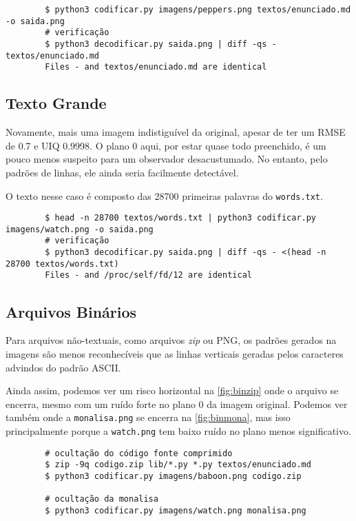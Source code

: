     \begin{verbatim}
        $ python3 codificar.py imagens/peppers.png textos/enunciado.md -o saida.png
        # verificação
        $ python3 decodificar.py saida.png | diff -qs - textos/enunciado.md
        Files - and textos/enunciado.md are identical
    \end{verbatim}

\subsection{Texto Grande}

    

    Novamente, mais uma imagem indistiguível da original, apesar de ter um RMSE de 0.7 e UIQ 0.9998. O plano 0 aqui, por estar quase todo preenchido, é um pouco menos suspeito para um observador desacustumado. No entanto, pelo padrões de linhas, ele ainda seria facilmente detectável.

    O texto nesse caso é composto das 28700 primeiras palavras do \texttt{words.txt}.

    \begin{verbatim}
        $ head -n 28700 textos/words.txt | python3 codificar.py imagens/watch.png -o saida.png
        # verificação
        $ python3 decodificar.py saida.png | diff -qs - <(head -n 28700 textos/words.txt)
        Files - and /proc/self/fd/12 are identical
    \end{verbatim}

\subsection{Arquivos Binários} \label{sec:binarios}

    
    

    Para arquivos não-textuais, como arquivos \textit{zip} ou PNG, os padrões gerados na imagens são menos reconhecíveis que as linhas verticais geradas pelos caracteres advindos do padrão ASCII.

    Ainda assim, podemos ver um risco horizontal na \cref{fig:binzip} onde o arquivo se encerra, mesmo com um ruído forte no plano 0 da imagem original. Podemos ver também onde a \texttt{monalisa.png} se encerra na \cref{fig:binmona}, mas isso principalmente porque a \texttt{watch.png} tem baixo ruído no plano menos significativo.

    \begin{verbatim}
        # ocultação do código fonte comprimido
        $ zip -9q codigo.zip lib/*.py *.py textos/enunciado.md
        $ python3 codificar.py imagens/baboon.png codigo.zip

        # ocultação da monalisa
        $ python3 codificar.py imagens/watch.png monalisa.png
    \end{verbatim}

